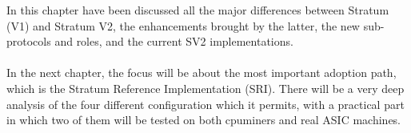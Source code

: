 \noindent In this chapter have been discussed all the major differences between Stratum (V1) and Stratum V2, the enhancements brought by the latter, the new sub-protocols and roles, and the current SV2 implementations.\\\\
In the next chapter, the focus will be about the most important adoption path, which is the Stratum Reference Implementation (SRI). There will be a very deep analysis of the four different configuration which it permits, with a practical part in which two of them will be tested on both cpuminers and real ASIC machines.